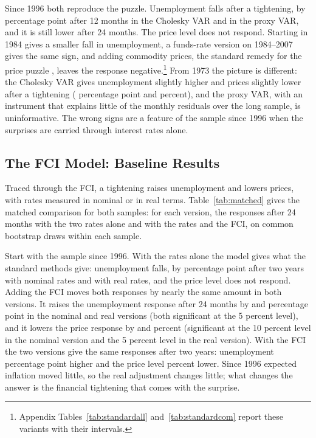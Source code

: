 \documentclass[11pt]{article}
\begin{document}
Since 1996 both reproduce the puzzle. Unemployment falls after a tightening, by  percentage point after 12 months in the Cholesky VAR and  in the proxy VAR, and it is still lower after 24 months. The price level does not respond. Starting in 1984 gives a smaller fall in unemployment, a funds-rate version on 1984--2007 gives the same sign, and adding commodity prices, the standard remedy for the price puzzle \citep{sims1992,ramey2016}, leaves the response negative.\footnote{Appendix Tables~\ref{tab:standardall} and~\ref{tab:standardcom} report these variants with their intervals.} From 1973 the picture is different: the Cholesky VAR gives unemployment slightly higher and prices slightly lower after a tightening ( percentage point and  percent), and the proxy VAR, with an instrument that explains little of the monthly residuals over the long sample, is uninformative. The wrong signs are a feature of the sample since 1996 when the surprises are carried through interest rates alone.

\subsection{The FCI Model: Baseline Results}\label{sec:baseline}
Traced through the FCI, a tightening raises unemployment and lowers prices, with rates measured in nominal or in real terms. Table~\ref{tab:matched} gives the matched comparison for both samples: for each version, the responses after 24 months with the two rates alone and with the rates and the FCI, on common bootstrap draws within each sample.



Start with the sample since 1996. With the rates alone the model gives what the standard methods give: unemployment falls, by  percentage point after two years with nominal rates and  with real rates, and the price level does not respond. Adding the FCI moves both responses by nearly the same amount in both versions. It raises the unemployment response after 24 months by  and  percentage point in the nominal and real versions (both significant at the 5 percent level), and it lowers the price response by  and  percent (significant at the 10 percent level in the nominal version and the 5 percent level in the real version). With the FCI the two versions give the same responses after two years: unemployment  percentage point higher and the price level  percent lower. Since 1996 expected inflation moved little, so the real adjustment changes little; what changes the answer is the financial tightening that comes with the surprise.
\end{document}
